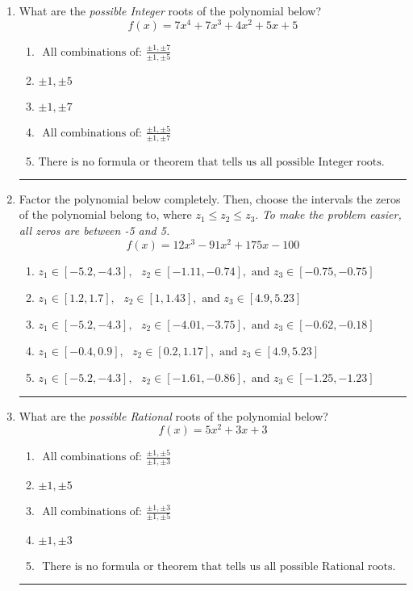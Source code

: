 \documentclass[14pt]{extbook}
\newcommand{\litem}[1]{\item#1\hspace*{-1cm}\rule{\textwidth}{0.4pt}}
\begin{document}
\begin{enumerate}
\litem{
What are the \textit{possible Integer} roots of the polynomial below?\[ f(x) = 7x^{4} +7 x^{3} +4 x^{2} +5 x + 5 \]\begin{enumerate}[label=\Alph*.]
\item \( \text{ All combinations of: }\frac{\pm 1,\pm 7}{\pm 1,\pm 5} \)
\item \( \pm 1,\pm 5 \)
\item \( \pm 1,\pm 7 \)
\item \( \text{ All combinations of: }\frac{\pm 1,\pm 5}{\pm 1,\pm 7} \)
\item \( \text{There is no formula or theorem that tells us all possible Integer roots.} \)

\end{enumerate} }
\litem{
Factor the polynomial below completely. Then, choose the intervals the zeros of the polynomial belong to, where $z_1 \leq z_2 \leq z_3$. \textit{To make the problem easier, all zeros are between -5 and 5.}\[ f(x) = 12x^{3} -91 x^{2} +175 x -100 \]\begin{enumerate}[label=\Alph*.]
\item \( z_1 \in [-5.2, -4.3], \text{   }  z_2 \in [-1.11, -0.74], \text{   and   } z_3 \in [-0.75, -0.75] \)
\item \( z_1 \in [1.2, 1.7], \text{   }  z_2 \in [1, 1.43], \text{   and   } z_3 \in [4.9, 5.23] \)
\item \( z_1 \in [-5.2, -4.3], \text{   }  z_2 \in [-4.01, -3.75], \text{   and   } z_3 \in [-0.62, -0.18] \)
\item \( z_1 \in [-0.4, 0.9], \text{   }  z_2 \in [0.2, 1.17], \text{   and   } z_3 \in [4.9, 5.23] \)
\item \( z_1 \in [-5.2, -4.3], \text{   }  z_2 \in [-1.61, -0.86], \text{   and   } z_3 \in [-1.25, -1.23] \)

\end{enumerate} }
\litem{
What are the \textit{possible Rational} roots of the polynomial below?\[ f(x) = 5x^{2} +3 x + 3 \]\begin{enumerate}[label=\Alph*.]
\item \( \text{ All combinations of: }\frac{\pm 1,\pm 5}{\pm 1,\pm 3} \)
\item \( \pm 1,\pm 5 \)
\item \( \text{ All combinations of: }\frac{\pm 1,\pm 3}{\pm 1,\pm 5} \)
\item \( \pm 1,\pm 3 \)
\item \( \text{ There is no formula or theorem that tells us all possible Rational roots.} \)


\end{enumerate}}
\end{enumerate}
\end{document}
